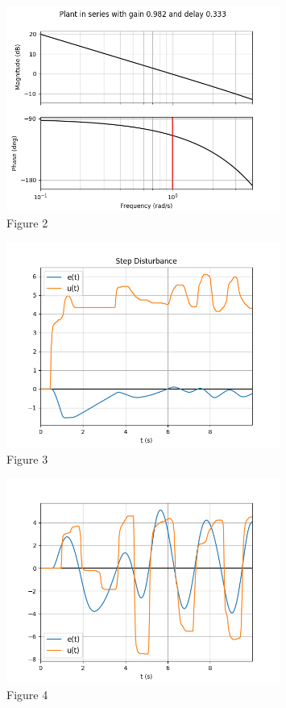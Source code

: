 \documentclass[8pt]{article}
\begin{document}
\begin{figure}
    \centering
    \includegraphics[width=0.8\textwidth]{figures/FIGURE_2.png}
    \caption{Figure 2}
    \label{fig:figure2}
\end{figure}

\newpage

\begin{figure}
    \centering
    \includegraphics[width=0.8\textwidth]{figures/FIGURE_3.png}
    \caption{Figure 3}
    \label{fig:figure3}
\end{figure}

\newpage

\begin{figure}
    \centering
    \includegraphics[width=0.8\textwidth]{figures/FIGURE_4.png}
    \caption{Figure 4}
    \label{fig:figure4}
\end{figure}
\end{document}
